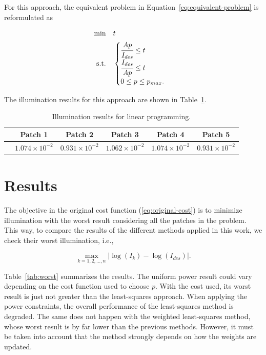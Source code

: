 \documentclass[11pt,a4paper]{article}
\begin{document}
For this approach, the equivalent problem in Equation~\ref{eq:equivalent-problem} is reformulated as 

\begin{equation*}
    \begin{aligned}
        \min \quad & t\\
        \text{s.t.} \quad & \begin{cases}   
            \cfrac{Ap}{I_{des}} \leq t\\
            \cfrac{I_{des}}{Ap} \leq t\\
            0 \leq p \leq p_{max}.\end{cases}
    \end{aligned}
\end{equation*}

The illumination results for this approach are shown in Table~\ref{tab:convex}.

\begin{table}[!htb]
    \centering
    \caption{Illumination results for linear programming.}
    \begin{tabular}{lccccc}
        \hline
        & Patch 1 & Patch 2 & Patch 3 & Patch 4 & Patch 5\\
        \hline
        & $1.074\times10^{-2}$ & $0.931\times10^{-2}$ & $1.062\times10^{-2}$ & $1.074\times10^{-2}$ & $0.931\times10^{-2}$\\
        \hline
    \end{tabular}\label{tab:convex}
\end{table}

\section{Results}

The objective in the original cost function (\ref{eq:original-cost}) is to minimize illumination with the worst result considering all the patches in the problem. This way, to compare the results of the different methods applied in this work, we check their worst illumination, i.e.,

\begin{equation}
    \underset{k=1,2,\dots,n}{\max} \vert \log(I_k) - \log(I_{des}) \vert.
    \label{eq:worst}
\end{equation}

Table~\ref{tab:worst} summarizes the results. The uniform power result could vary depending on the cost function used to choose $p$. With the cost used, its worst result is just not greater than the least-squares approach. When applying the power constraints, the overall performance of the least-squares method is degraded. The same does not happen with the weighted least-squares method, whose worst result is by far lower than the previous methods. However, it must be taken into account that the method strongly depends on how the weights are updated.
\end{document}
